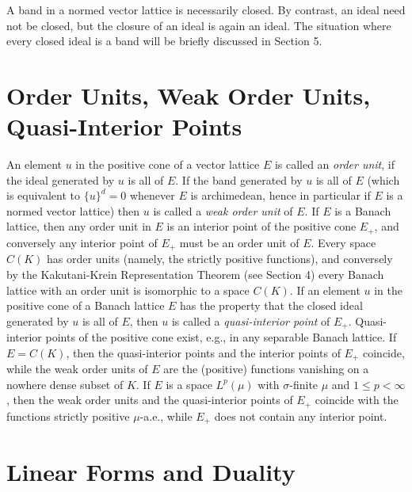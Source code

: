 \pagebreak

A band in a normed vector lattice is necessarily closed.
By contrast, an ideal need not be closed, but the closure of an ideal is again an ideal.
The situation where every closed ideal is a band will be briefly discussed in Section 5.

\section{Order Units, Weak Order Units, Quasi-Interior Points}\label{sec:c1-2}

An element $ u $ in the positive cone of a vector lattice $ E $ is called an \emph{order unit}, if the ideal generated by $ u $ is all of $ E $.
If the band generated by $ u $ is all of $ E $ (which is equivalent to $ \{u\}^{d} = 0 $ whenever $ E $ is archimedean, hence in particular if $ E $ is a normed vector lattice) then $ u $ is called a \emph{weak order unit} of $ E $.
If $ E $ is a Banach lattice, then any order unit in $ E $ is an interior point of the positive cone $ E_{+} $, and conversely any interior point of $ E_{+} $ must be an order unit of $ E $.
Every space $ C(K) $ has order units (namely, the strictly positive functions), and conversely by the Kakutani-Krein Representation Theorem (see Section 4) every Banach lattice with an order unit is isomorphic to a space $ C(K) $.
If an element $ u $ in the positive cone of a Banach lattice $ E $ has the property that the closed ideal generated by $ u $ is all of $ E $, then $ u $ is called a \emph{quasi-interior point} of $ E_{+} $.
Quasi-interior points of the positive cone exist, e.g., in any separable Banach lattice.
If $ E = C(K) $, then the quasi-interior points and the interior points of $ E_{+} $ coincide, while the weak order units of $ E $ are the (positive) functions vanishing on a nowhere dense subset of $ K $.
If $ E $ is a space $ L^{p}(\mu) $ with $ \sigma $-finite $ \mu $ and $ 1 \leq p < \infty $, then the weak order units and the quasi-interior points of $ E_{+} $ coincide with the functions strictly positive $ \mu $-a.e., while $ E_{+} $ does not contain any interior point.

\section{Linear Forms and Duality}\label{sec:c1-3}

